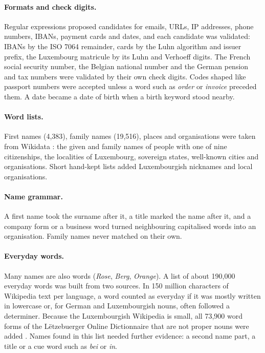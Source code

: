 \documentclass[10pt,a4paper,twocolumn]{article}
\begin{document}
\paragraph{Formats and check digits.} Regular expressions proposed candidates for emails, URLs,
IP addresses, phone numbers, IBANs, payment cards and dates, and each candidate was validated:
IBANs by the ISO 7064 remainder, cards by the Luhn algorithm and issuer prefix, the Luxembourg
matricule by its Luhn and Verhoeff digits. The French social security number, the Belgian national
number and the German pension and tax numbers were validated by their own check digits. Codes
shaped like passport numbers were accepted unless a word such as \emph{order} or \emph{invoice}
preceded them. A date became a date of birth when a birth keyword stood nearby.

\paragraph{Word lists.} First names (4{,}383), family names (19{,}516), places and organisations
were taken from Wikidata \citep{vrandecic2014wikidata}: the given and family names of people with
one of nine citizenships, the localities of Luxembourg, sovereign states, well-known cities and
organisations. Short hand-kept lists added Luxembourgish nicknames and local organisations.

\paragraph{Name grammar.} A first name took the surname after it, a title marked the name after
it, and a company form or a business word turned neighbouring capitalised words into an
organisation. Family names never matched on their own.

\paragraph{Everyday words.} Many names are also words (\emph{Rose}, \emph{Berg}, \emph{Orange}).
A list of about 190{,}000 everyday words was built from two sources. In 150 million characters of
Wikipedia text per language, a word counted as everyday if it was mostly written in lowercase or,
for German and Luxembourgish nouns, often followed a determiner. Because the Luxembourgish
Wikipedia is small, all 73{,}900 word forms of the L\"etzebuerger Online Dictionnaire that are not
proper nouns were added \citep{lod}. Names found in this list needed further evidence: a second
name part, a title or a cue word such as \emph{bei} or \emph{in}.
\end{document}
